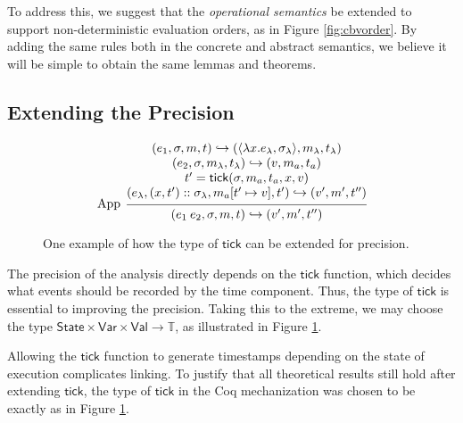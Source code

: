 \documentclass[acmsmall,screen,review]{acmart}\settopmatter{printfolios=true,printccs=false,printacmref=false}
\theoremstyle{acmdefinition}
\newcommand*{\cons}{::}
\newcommand*{\ExprVar}{\mathsf{Var}}
\newcommand*{\Time}{\mathbb{T}}
\newcommand*{\ctx}{\sigma}
\newcommand*{\Value}{\mathsf{Val}}
\newcommand*{\mem}{m}
\newcommand*{\State}{\mathsf{State}}
\newcommand*{\semarrow}{\hookrightarrow}
\newcommand*{\tick}{\mathsf{tick}}
\begin{document}
To address this, we suggest that the \emph{operational semantics} be extended to support non-deterministic evaluation orders, as in Figure \ref{fig:cbvorder}.
By adding the same rules both in the concrete and abstract semantics, we believe it will be simple to obtain the same lemmas and theorems.

\subsection{Extending the Precision}
\begin{figure}[h!]
  \scriptsize
  \begin{flushright}
    \fbox{$(e,\ctx,\mem,t)\semarrow(V,\mem',t')\text{ or }(e',\ctx',\mem',t')$}
  \end{flushright}
  \[
    \begin{prooftree}
      \hypo{
        \begin{matrix}
          (e_{1}, \ctx, \mem, t)
          \semarrow
          (\langle\lambda x.e_{\lambda}, \ctx_{\lambda}\rangle, \mem_{\lambda}, t_{\lambda}) \\
          (e_{2}, \ctx, \mem_{\lambda}, t_{\lambda})
          \semarrow
          (v, \mem_{a}, t_{a})                                                               \\
          t'=\tick(\ctx,\mem_{a},t_{a},x,v)                                                  \\
          (e_{\lambda}, (x, t')\cons \ctx_{\lambda}, \mem_{a}[t'\mapsto v], t')
          \semarrow
          (v', \mem',t'')
        \end{matrix}
      }
      \infer[left label={App}]1{
      (e_{1}\:e_{2}, \ctx, \mem, t)
      \semarrow
      (v', \mem',t'')
      }
    \end{prooftree}
  \]
  \caption{One example of how the type of $\tick$ can be extended for precision.}
  \label{fig:highprecision}
\end{figure}
The precision of the analysis directly depends on the $\tick$ function, which decides what events should be recorded by the time component.
Thus, the type of $\tick$ is essential to improving the precision.
Taking this to the extreme, we may choose the type $\State\times\ExprVar\times\Value\rightarrow\Time$, as illustrated in Figure \ref{fig:highprecision}.

Allowing the $\tick$ function to generate timestamps depending on the state of execution complicates linking.
To justify that all theoretical results still hold after extending $\tick$, the type of $\tick$ in the Coq mechanization was chosen to be exactly as in Figure \ref{fig:highprecision}.
\end{document}
